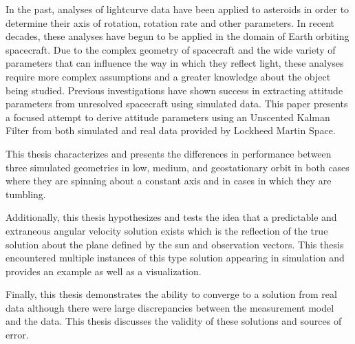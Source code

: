 In the past, analyses of lightcurve data have been applied to asteroids in order to determine their axis of rotation, rotation rate and other parameters. In recent decades, these analyses have begun to be applied in the domain of Earth orbiting spacecraft. Due to the complex geometry of spacecraft and the wide variety of parameters that can influence the way in which they reflect light, these analyses require more complex assumptions and a greater knowledge about the object being studied. Previous investigations have shown success in extracting attitude parameters from unresolved spacecraft using simulated data. This paper presents a focused attempt to derive attitude parameters using an Unscented Kalman Filter from both simulated and real data provided by Lockheed Martin Space.

This thesis characterizes and presents the differences in performance between three simulated geometries in low, medium, and geostationary orbit in both cases where they are spinning about a constant axis and in cases in which they are tumbling. 

Additionally, this thesis hypothesizes and tests the idea that a predictable and extraneous angular velocity solution exists which is the reflection of the true solution about the plane defined by the sun and observation vectors. This thesis encountered multiple instances of this type solution appearing in simulation and provides an example as well as a visualization.

Finally, this thesis demonstrates the ability to converge to a solution from real data although there were large discrepancies between the measurement model and the data. This thesis discusses the validity of these solutions and sources of error.